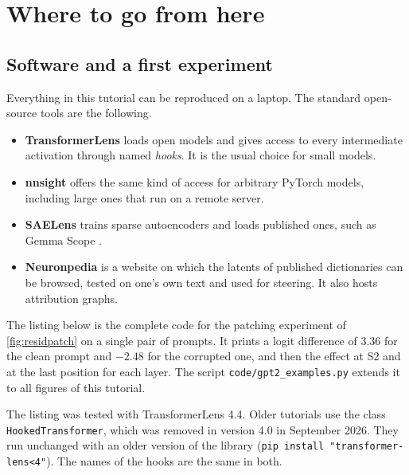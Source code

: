 \section{Where to go from here}
\label{sec:practice}

\subsection{Software and a first experiment}

Everything in this tutorial can be reproduced on a laptop. The standard open-source tools are the following.

\begin{itemize}
\item \textbf{TransformerLens} \citep{nanda2022transformerlens} loads open models and gives access to every
intermediate activation through named \emph{hooks}. It is the usual choice for small models.
\item \textbf{nnsight} \citep{fiottokaufman2025nnsight} offers the same kind of access for arbitrary PyTorch
models, including large ones that run on a remote server.
\item \textbf{SAELens} \citep{bloom2024saelens} trains sparse autoencoders and loads published ones, such as
Gemma Scope \citep{lieberum2024gemma}.
\item \textbf{Neuronpedia} \citep{lin2023neuronpedia} is a website on which the latents of published
dictionaries can be browsed, tested on one's own text and used for steering. It also hosts attribution graphs.
\end{itemize}

The listing below is the complete code for the patching experiment of \cref{fig:residpatch} on a single pair of
prompts. It prints a logit difference of $3.36$ for the clean prompt and $-2.48$ for the corrupted one, and
then the effect at S2 and at the last position for each layer. The script \texttt{code/gpt2\_examples.py}
extends it to all figures of this tutorial.



\begin{caution}
The listing was tested with TransformerLens 4.4. Older tutorials use the class \texttt{HookedTransformer},
which was removed in version 4.0 in September 2026. They run unchanged with an older version of the
library (\texttt{pip install "transformer-lens<4"}). The names of the hooks are the same in both.
\end{caution}

